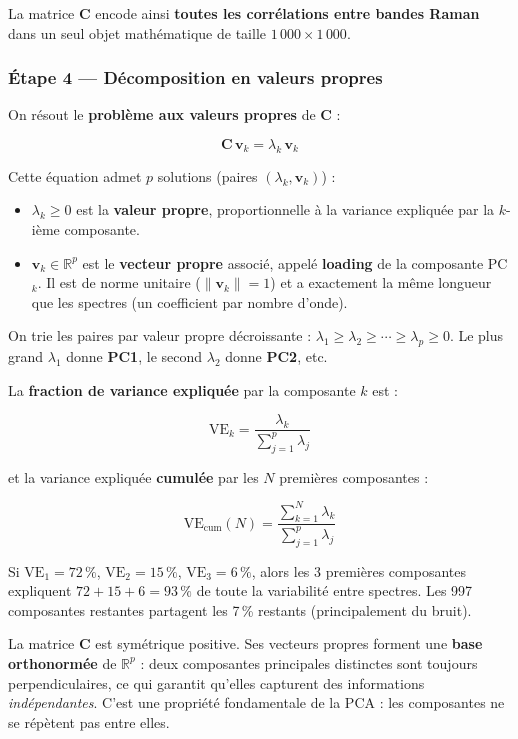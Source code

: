 \documentclass[12pt, a4paper]{article}
\newcommand{\C}{\mathbf{C}}
\newcommand{\vv}{\mathbf{v}}
\begin{document}
La matrice $\C$ encode ainsi \textbf{toutes les corrélations entre bandes
Raman} dans un seul objet mathématique de taille $1\,000 \times 1\,000$.

\subsubsection{Étape 4 --- Décomposition en valeurs propres}

On résout le \textbf{problème aux valeurs propres} de $\C$ :

\[
\C\,\vv_k = \lambda_k\,\vv_k
\]

Cette équation admet $p$ solutions (paires $(\lambda_k, \vv_k)$) :

\begin{itemize}
  \item $\lambda_k \geq 0$ est la \textbf{valeur propre}, proportionnelle à la
        variance expliquée par la $k$-ième composante.
  \item $\vv_k \in \mathbb{R}^p$ est le \textbf{vecteur propre} associé,
        appelé \textbf{loading} de la composante PC$_k$.
        Il est de norme unitaire ($\|\vv_k\| = 1$) et a exactement la même
        longueur que les spectres (un coefficient par nombre d'onde).
\end{itemize}

On trie les paires par valeur propre décroissante :
$\lambda_1 \geq \lambda_2 \geq \cdots \geq \lambda_p \geq 0$.
Le plus grand $\lambda_1$ donne \textbf{PC1}, le second $\lambda_2$ donne
\textbf{PC2}, etc.

La \textbf{fraction de variance expliquée} par la composante $k$ est :

\[
\text{VE}_k = \frac{\lambda_k}{\displaystyle\sum_{j=1}^{p} \lambda_j}
\]

et la variance expliquée \textbf{cumulée} par les $N$ premières composantes :

\[
\text{VE}_{\text{cum}}(N) = \frac{\displaystyle\sum_{k=1}^{N} \lambda_k}
                                  {\displaystyle\sum_{j=1}^{p} \lambda_j}
\]

\begin{exemple}
Si $\text{VE}_1 = 72\,\%$, $\text{VE}_2 = 15\,\%$, $\text{VE}_3 = 6\,\%$,
alors les 3 premières composantes expliquent $72 + 15 + 6 = 93\,\%$ de toute
la variabilité entre spectres. Les 997 composantes restantes partagent les
7\,\% restants (principalement du bruit).
\end{exemple}

\begin{remarque}[title=Pourquoi les valeurs propres de $\C$ ?]
La matrice $\C$ est symétrique positive. Ses vecteurs propres forment une
\textbf{base orthonormée} de $\mathbb{R}^p$ : deux composantes principales
distinctes sont toujours perpendiculaires, ce qui garantit qu'elles capturent
des informations \emph{indépendantes}. C'est une propriété fondamentale de la
PCA : les composantes ne se répètent pas entre elles.
\end{remarque}
\end{document}
